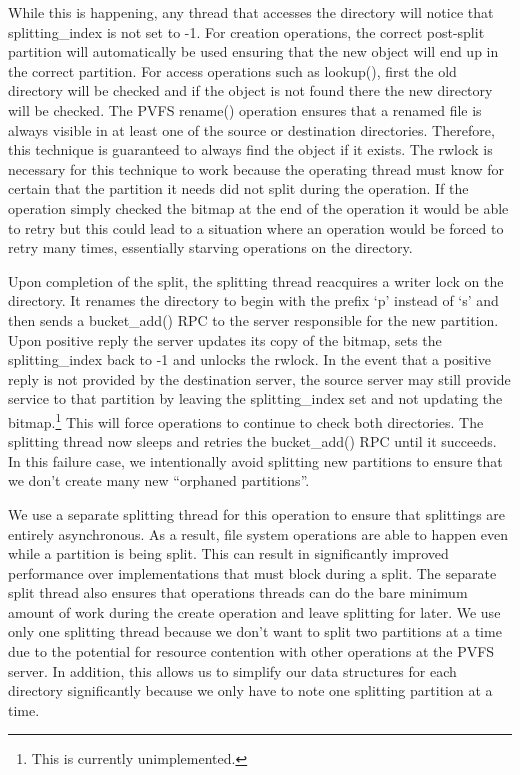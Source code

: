 \documentclass[letterpaper]{article}
\begin{document}
While this is happening, any thread that accesses the directory will notice that
splitting\_\-index is not set to -1.  For creation operations, the correct
post-split partition will automatically be used ensuring that the new object
will end up in the correct partition.  For access operations such as lookup(),
first the old directory will be checked and if the object is not found there the
new directory will be checked.  The PVFS rename() operation ensures that a
renamed file is always visible in at least one of the source or destination
directories.  Therefore, this technique is guaranteed to always find the object 
if it exists.  The rwlock is necessary for this technique to work because the
operating thread must know for certain that the partition it needs did not split
during the operation.  If the operation simply checked the bitmap at the end of
the operation it would be able to retry but this could lead to a situation where
an operation would be forced to retry many times, essentially starving
operations on the directory.

Upon completion of the split, the splitting thread reacquires a writer lock on
the directory.  It renames the directory to begin with the prefix `p' instead of
`s' and then sends a bucket\_\-add() RPC to the server responsible for the new
partition.  Upon positive reply the server updates its copy of the bitmap, sets
the splitting\_\-index back to -1 and unlocks the rwlock.  In the event that
a positive reply is not provided by the destination server, the source server
may still provide service to that partition by leaving the splitting\_\-index set
and not updating the bitmap.\footnote{This is currently unimplemented.}  This
will force operations to continue to check both directories.  The splitting
thread now sleeps and retries the bucket\_\-add() RPC until it succeeds.  In
this failure case, we intentionally avoid splitting new partitions to ensure
that we don't create many new ``orphaned partitions''.

We use a separate splitting thread for this operation to ensure that splittings
are entirely asynchronous.  As a result, file system operations are able to
happen even while a partition is being split.  This can result in significantly
improved performance over implementations that must block during a split.  The
separate split thread also ensures that operations threads can do the bare
minimum amount of work during the create operation and leave splitting for
later.  We use only one splitting thread because we don't want to split two
partitions at a time due to the potential for resource contention with other
operations at the PVFS server.  In addition, this allows us to simplify our data
structures for each directory significantly because we only have to note one
splitting partition at a time.
\end{document}
